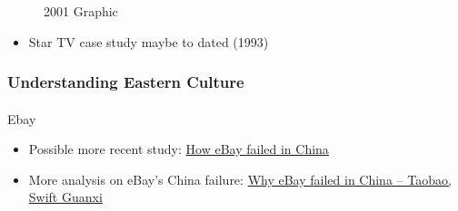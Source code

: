 \documentclass[
  11pt,
]{article}
\makeatletter
\let\oldparagraph\paragraph
\renewcommand{\paragraph}{
    \@ifstar
      \xxxParagraphStar
      \xxxParagraphNoStar
  }
\newcommand{\xxxParagraphStar}[1]{\oldparagraph*{#1}\mbox{}}
\newcommand{\xxxParagraphNoStar}[1]{\oldparagraph{#1}\mbox{}}
\providecommand{\tightlist}{%
  \setlength{\itemsep}{0pt}\setlength{\parskip}{0pt}}
\makeatother
\begin{document}
\begin{figure}


\caption{\label{fig-1}2001 Graphic}

\end{figure}%

\begin{itemize}
\tightlist
\item
  Star TV case study maybe to dated (1993)
\end{itemize}

\subsubsection{Understanding Eastern
Culture}\label{understanding-eastern-culture}

\paragraph{Ebay}\label{ebay}

\begin{itemize}
\tightlist
\item
  Possible more recent study:
  \href{https://www.forbes.com/sites/helenwang/2010/09/12/how-ebay-failed-in-china/}{How
  eBay failed in China}
\item
  More analysis on eBay's China failure:
  \href{https://psmag.com/economics/why-ebay-failed-in-china-taobao-swift-guanxi-60072/}{Why
  eBay failed in China -- Taobao, Swift Guanxi}
\end{itemize}
\end{document}
